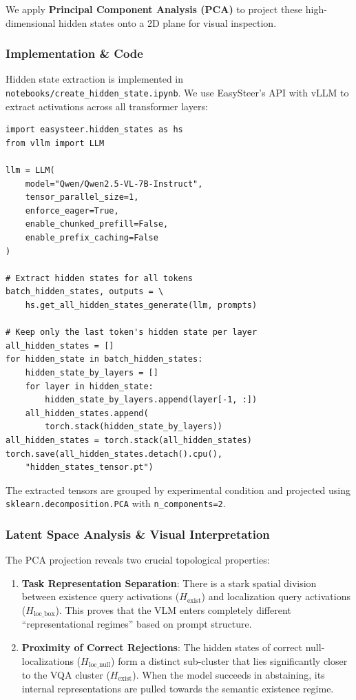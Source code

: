 \documentclass[12pt,a4paper]{article}
\begin{document}
We apply \textbf{Principal Component Analysis (PCA)} to project these high-dimensional hidden states onto a 2D plane for visual inspection.

\subsubsection{Implementation \& Code}
Hidden state extraction is implemented in \texttt{notebooks/create\_hidden\_state.ipynb}. We use EasySteer's API with vLLM to extract activations across all transformer layers:

\begin{lstlisting}[caption={Hidden state extraction (\texttt{create\_hidden\_state.ipynb})}]
import easysteer.hidden_states as hs
from vllm import LLM

llm = LLM(
    model="Qwen/Qwen2.5-VL-7B-Instruct",
    tensor_parallel_size=1,
    enforce_eager=True,
    enable_chunked_prefill=False,
    enable_prefix_caching=False
)

# Extract hidden states for all tokens
batch_hidden_states, outputs = \
    hs.get_all_hidden_states_generate(llm, prompts)

# Keep only the last token's hidden state per layer
all_hidden_states = []
for hidden_state in batch_hidden_states:
    hidden_state_by_layers = []
    for layer in hidden_state:
        hidden_state_by_layers.append(layer[-1, :])
    all_hidden_states.append(
        torch.stack(hidden_state_by_layers))
all_hidden_states = torch.stack(all_hidden_states)
torch.save(all_hidden_states.detach().cpu(),
    "hidden_states_tensor.pt")
\end{lstlisting}

The extracted tensors are grouped by experimental condition and projected using \texttt{sklearn.decomposition.PCA} with \texttt{n\_components=2}.

\subsubsection{Latent Space Analysis \& Visual Interpretation}
The PCA projection reveals two crucial topological properties:

\begin{enumerate}[leftmargin=*]
\item \textbf{Task Representation Separation}: There is a stark spatial division between existence query activations ($H_{\text{exist}}$) and localization query activations ($H_{\text{loc\_box}}$). This proves that the VLM enters completely different ``representational regimes'' based on prompt structure.
\item \textbf{Proximity of Correct Rejections}: The hidden states of correct null-localizations ($H_{\text{loc\_null}}$) form a distinct sub-cluster that lies significantly closer to the VQA cluster ($H_{\text{exist}}$). When the model succeeds in abstaining, its internal representations are pulled towards the semantic existence regime.
\end{enumerate}
\end{document}

